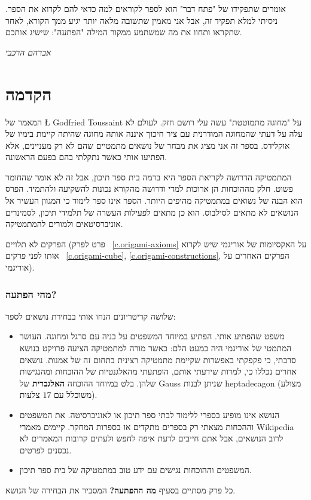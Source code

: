 אומרים שתפקידו של "פתח דבר" הוא לספר לקוראים למה כדאי להם לקרוא את הספר. ניסיתי למלא תפקיד זה, אבל אני מאמין שתשובה מלאה יותר יגיע ממך הקורא, לאחר שתקראו ותחוו את מה שמשתמע ממקור המילה "הפתעה": שישיג אותכם.

\vspace{\baselineskip}
\begin{flushleft}
\textit{אברהם הרכבי}
\end{flushleft}


\chapter*{הקדמה}
\thispagestyle{empty}

המאמר של 
\L{\cite{toussaint} Godfried Toussaint}
על "מחוגה מתמוטטת" עשה עלי רושם חזק. לעולם לא עלה על דעתי שהמחוגה המודרנית עם ציר חיכוך איננה אותה מחוגה שהיתה קיימת בימיו של אוקלידס. 
בספר זה אני מציג את מבחר של נושאים מתמטיים שהם לא רק מעניינים, אלא הפתיעו אותי כאשר נתקלתי בהם בפעם הראשונה. 

המתמטיקה הדרושה לקריאת הספר היא ברמה בית ספר תיכון, אבל זה לא אומר שהחומר פשוט. חלק מההוכחות הן ארוכות למדי ודרושה מהקורא נכונות להשקיעה ולהתמיד. הפרס הוא הבנה של נשואים במתמטיקה מהיפים היותר. הספר אינו ספר לימוד כי המגוון העשיר אל הנושאים לא מתאים לסילבוס. הוא כן מתאים לפעילות העשרה של תלמידי תיכון, לסמינרים אוניברסיטאים ולמורים להמתמטיקה.


הפרקים לא תלויים (פרט לפרק~%
\ref{c.origami-axioms}
על האקסיומות של אוריגמי שיש לקרוא אותו לפני פרקים~%
\ref{c.origami-cube}, \ref{c.origami-constructions},
הפרקים האחרים על אוריגמי).

\subsection*{מהי הפתעה?}

שלושה קריטריונים הנחו אותי בבחירת נושאים לספר:
\begin{itemize}
\item 
משפט שהפתיע אותי. הפתיע במיוחד המשפטים על בניה עם סרגל ומחוגה. העושר המתמטי של אוריגמי היה כמעט הלם: כאשר מורה למתמטיקה הציעה פרויקט בנושא סרבתי, כי פקפקתי באפשרות שקיימת מתמטיקה רצינית בתחום זה של אמנות. נושאים אחרים נכללו כי, למרות שידעתי אותם, הופתעתי מהאלגנטיות של ההוכחות ומהנגישות שלהן. בלט במיוחד ההוכחה 
\textbf{האלגברית}
של Gauss שניתן לבנות heptadecagon (מצולע משוכלל עם $17$ צלעות).

\item
הנושא אינו מופיע בספרי ללימוד לבתי ספר תיכון או לאוניברסיטה. את המשפטים וההכחות מצאתי רק בספרים מתקדים או בספרות המחקר. קיימים מאמרי Wikipedia לרוב הנושאים, אבל אתם חייבים לדעת איפה לחפש ולעתים קרובות המאמרים לא נכסנים לפרטים.

\item
המשפטים וההוכחות נגישים עם ידע טוב במתמטיקה של בית ספר תיכון.
\end{itemize}
כל פרק מסתיים בסעיף 
\textbf{מה ההפתעה?}
המסביר את הבחירה של הנושא.

